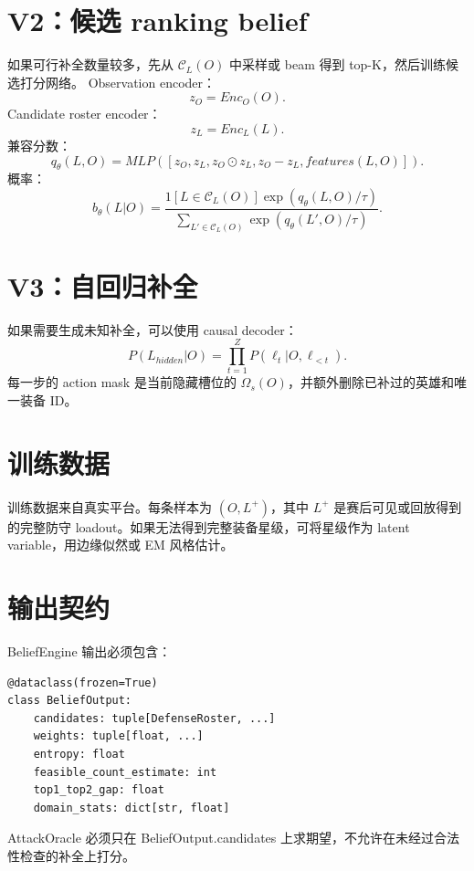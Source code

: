 \documentclass[UTF8,12pt,openany]{ctexbook}
\newcommand{\Ccal}{\mathcal{C}}
\begin{document}
\section{V2：候选 ranking belief}
如果可行补全数量较多，先从 $\Ccal_L(O)$ 中采样或 beam 得到 top-K，然后训练候选打分网络。
Observation encoder：
\begin{equation}
z_O=Enc_O(O).
\end{equation}
Candidate roster encoder：
\begin{equation}
z_L=Enc_L(L).
\end{equation}
兼容分数：
\begin{equation}
q_\theta(L,O)=MLP([z_O,z_L,z_O\odot z_L,z_O-z_L,features(L,O)]).
\end{equation}
概率：
\begin{equation}
b_\theta(L|O)=\frac{1[L\in\Ccal_L(O)]\exp(q_\theta(L,O)/\tau)}{\sum_{L'\in\Ccal_L(O)}\exp(q_\theta(L',O)/\tau)}.
\end{equation}

\section{V3：自回归补全}
如果需要生成未知补全，可以使用 causal decoder：
\begin{equation}
P(L_{hidden}|O)=\prod_{t=1}^{Z}P(\ell_t|O,\ell_{<t}).
\end{equation}
每一步的 action mask 是当前隐藏槽位的 $\Omega_s(O)$，并额外删除已补过的英雄和唯一装备 ID。

\section{训练数据}
训练数据来自真实平台。每条样本为 $(O,L^+)$，其中 $L^+$ 是赛后可见或回放得到的完整防守 loadout。如果无法得到完整装备星级，可将星级作为 latent variable，用边缘似然或 EM 风格估计。

\section{输出契约}
BeliefEngine 输出必须包含：
\begin{lstlisting}[caption={BeliefOutput}]
@dataclass(frozen=True)
class BeliefOutput:
    candidates: tuple[DefenseRoster, ...]
    weights: tuple[float, ...]
    entropy: float
    feasible_count_estimate: int
    top1_top2_gap: float
    domain_stats: dict[str, float]
\end{lstlisting}

AttackOracle 必须只在 BeliefOutput.candidates 上求期望，不允许在未经过合法性检查的补全上打分。
\end{document}
